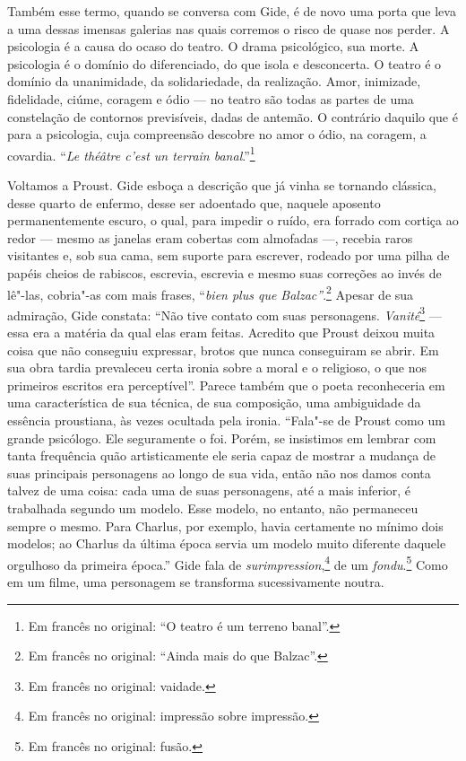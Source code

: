 Também esse termo, quando se conversa com Gide, é de novo uma porta que
leva a uma dessas imensas galerias nas quais corremos o risco de quase nos
perder. A psicologia é a causa do ocaso do teatro. O drama psicológico,
sua morte. A psicologia é o domínio do diferenciado, do que isola e
desconcerta. O teatro é o domínio da unanimidade, da solidariedade, da
realização. Amor, inimizade, fidelidade, ciúme, coragem e ódio --- no
teatro são todas as partes de uma constelação de contornos previsíveis,
dadas de antemão. O contrário daquilo que é para a psicologia, cuja
compreensão descobre no amor o ódio, na coragem, a covardia. ``\emph{Le
théâtre c'est un terrain banal}.''\footnote{Em francês no original: ``O teatro é um terreno banal''. \versal{[N.~T.]}}

Voltamos a Proust. Gide esboça a descrição que já vinha se tornando
clássica, desse quarto de enfermo, desse ser adoentado que, naquele aposento
permanentemente escuro, o qual, para impedir o ruído, era forrado
com cortiça ao redor --- mesmo as janelas eram cobertas com almofadas ---,
recebia raros visitantes e, sob sua cama, sem suporte para escrever,
rodeado por uma pilha de papéis cheios de rabiscos, escrevia, escrevia e
mesmo suas correções ao invés de lê"-las, cobria"-as com mais frases,
``\emph{bien plus que Balzac''}.\footnote{Em francês no original: ``Ainda mais do que
  Balzac''. \versal{[N.~T.]}} Apesar de sua admiração, Gide constata: ``Não tive
contato com suas personagens. \emph{Vanité}\footnote{Em francês no original: vaidade. \versal{[N.~T.]}} --- essa era a matéria da qual elas eram feitas. Acredito que
Proust deixou muita coisa que não conseguiu expressar, brotos que nunca
conseguiram se abrir. Em sua obra tardia prevaleceu certa ironia sobre a
moral e o religioso, o que nos primeiros escritos era perceptível''.
Parece também que o poeta reconheceria em uma característica de sua
técnica, de sua composição, uma ambiguidade da essência proustiana, às
vezes ocultada pela ironia. ``Fala"-se de Proust como um grande
psicólogo. Ele seguramente o foi. Porém, se insistimos em lembrar com
tanta frequência quão artisticamente ele seria capaz de mostrar a
mudança de suas principais personagens ao longo de sua vida, então não
nos damos conta talvez de uma coisa: cada uma de suas personagens, até a
mais inferior, é trabalhada segundo um modelo. Esse modelo, no entanto,
não permaneceu sempre o mesmo. Para Charlus, por exemplo, havia
certamente no mínimo dois modelos; ao Charlus da última época servia um
modelo muito diferente daquele orgulhoso da primeira época.'' Gide fala
de \emph{surimpression},\footnote{Em francês no original: impressão sobre impressão. \versal{[N.~T.]}} de um \emph{fondu}.\footnote{Em francês no original: fusão. \versal{[N.~T.]}} Como em um filme, uma personagem se transforma sucessivamente
noutra.

